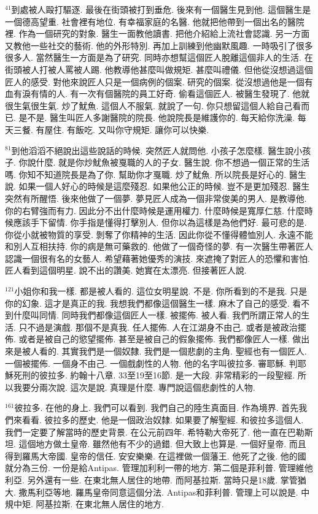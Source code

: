 \documentclass{book}
\begin{document}
$^{41}$到處被人毆打驅逐.
最後在街頭被打到垂危.
後來有一個醫生見到他.
這個醫生是一個德高望重.
社會裡有地位.
有幸福家庭的名醫.
他就把他帶到一個出名的醫院裡.
作為一個研究的對象.
醫生一面教他讀書.
把他介紹給上流社會認識.
另一方面又教他一些社交的藝術.
他的外形特別.
再加上訓練到他幽默風趣.
一時吸引了很多很多人.
當然醫生一方面是為了研究.
同時亦想幫這個匠人脫離這個非人的生活.
在街頭被人打被人罵被人踢.
他教導他甚麼叫做規矩.
甚麼叫禮儀.
但他從沒想過這個匠人的感受.
對他來說匠人只是一個病例的個案.
研究的個案.
從沒想過他是一個有血有淚有情的人.
有一次有個醫院的員工好奇.
偷看這個匠人.
被醫生發現了.
他就很生氣很生氣.
炒了魷魚.
這個人不服氣.
就說了一句.
你只想留這個人給自己看而已.
是不是.
醫生叫匠人多謝醫院的院長.
他說院長是維護你的.
每天給你洗澡.
每天三餐.
有屋住.
有飯吃.
又叫你守規矩.
讓你可以快樂.

$^{81}$到他滔滔不絕說出這些說話的時候.
突然匠人就問他.
小孩子怎麼樣.
醫生說小孩子.
你說什麼.
就是你炒魷魚被戛職的人的子女.
醫生說.
你不想過一個正常的生活嗎.
你知不知道院長是為了你.
幫助你才戛職.
炒了魷魚.
所以院長是好心的.
醫生說.
如果一個人好心的時候是這麼殘忍.
如果他公正的時候.
豈不是更加殘忍.
醫生突然有所醒悟.
後來他做了一個夢.
夢見匠人成為一個非常俊美的男人.
是教導他.
你的右臂強而有力.
因此分不出什麼時候是運用權力.
什麼時候是寬厚仁慈.
什麼時候應該手下留情.
你手指是懂得打擊別人.
但你以為這樣是為他們好.
最可悲的是.
你從小就被物質的享受.
剝奪了你精神的生活.
因此你從不懂得體恤別人.
永遠不能和別人互相扶持.
你的病是無可藥救的.
他做了一個奇怪的夢.
有一次醫生帶著匠人認識一個很有名的女藝人.
希望藉著她優秀的演技.
來遮掩了對匠人的恐懼和害怕.
匠人看到這個明星.
說不出的讚美.
她實在太漂亮.
但接著匠人說.

$^{121}$小姐你和我一樣.
都是被人看的.
這位女明星說.
不是.
你所看到的不是我.
只是你的幻象.
這才是真正的我.
我想我們都像這個醫生一樣.
麻木了自己的感受.
看不到什麼叫同情.
同時我們都像這個匠人一樣.
被擺佈.
被人看.
我們所謂正常人的生活.
只不過是演戲.
那個不是真我.
任人擺佈.
人在江湖身不由己.
或者是被政治擺佈.
或者是被自己的慾望擺佈.
甚至是被自己的假象擺佈.
我們都像匠人一樣.
做出來是被人看的.
其實我們是一個奴隸.
我們是一個悲劇的主角.
聖經也有一個匠人.
一個被擺佈.
一個身不由己.
一個戲劇性的人物.
他的名字叫彼拉多.
審耶穌.
判耶穌死刑的彼拉多.
約翰十八章.
33至19至16節.
是一大段.
非常精彩的一段聖經.
所以我要分兩次說.
這次是說.
真理是什麼.
專門說這個悲劇性的人物.

$^{161}$彼拉多.
在他的身上.
我們可以看到.
我們自己的陸生真面目.
作為境界.
首先我們來看看.
彼拉多的歷史.
他是一個政治奴隸.
如果要了解聖經.
和彼拉多這個人.
我們一定要了解當時的歷史背景.
在公元前四年.
希特勒大帝死了.
他一直在巴勒斯坦.
這個地方做土皇帝.
雖然他有不少的過錯.
但大致上也算是.
一個好皇帝.
而且得到羅馬大帝國.
皇帝的信任.
安安樂樂.
在這裡做一個藩王.
他死了之後.
他的國就分為三份.
一份是給Antipas.
管理加利利一帶的地方.
第二個是菲利普.
管理維他利亞.
另外還有一些.
在東北無人居住的地帶.
而阿基拉斯.
當時只是18歲.
掌管猶大.
撒馬利亞等地.
羅馬皇帝同意這個分法.
Antipas和菲利普.
管理上可以說是.
中規中矩.
阿基拉斯.
在東北無人居住的地方.
\end{document}
